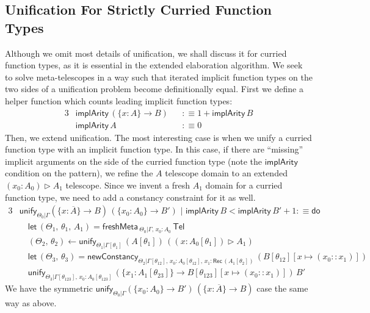 \documentclass[acmsmall,review,anonymous,prologue,dvipsnames]{acmart}\settopmatter{printfolios=true,printccs=false,printacmref=false}
\newcommand{\slet}{\boldsymbol{\mathsf{let}}}
\newcommand{\freshMeta}[3]{\mathsf{freshMeta}\,_{#1|#2}\,#3}
\newcommand{\newConstancy}[5]{\mathsf{newConstancy}_{#1|#2,\,#3 : \Rec\,#4}\,#5}
\newcommand{\unify}{\mathsf{unify}}
\newcommand{\edo}{\boldsymbol{\mathsf{do}}}
\newcommand{\Tel}{\mathsf{Tel}}
\newcommand{\TCons}{\triangleright}
\newcommand{\Rec}{\mathsf{Rec}}
\newcommand{\ol}[1]{\overline{#1}}
\newcommand{\implArity}{\mathsf{implArity}}
\theoremstyle{remark}
\begin{document}
\subsection{Unification For Strictly Curried Function Types}
\label{sec:curriedunif}
Although we omit most details of unification, we shall discuss it for curried
function types, as it is essential in the extended elaboration algorithm. We
seek to solve meta-telescopes in a way such that iterated implicit function
types on the two sides of a unification problem become definitionally
equal. First we define a helper function which counts leading implicit function
types:
\begin{alignat*}{3}
  & \implArity\,(\{x : A\}\to B) && :\equiv 1 + \implArity\,B\\
  & \implArity\,A                && :\equiv 0
\end{alignat*}
Then, we extend unification. The most interesting case is when we unify a
curried function type with an implicit function type. In this case, if there are
``missing'' implicit arguments on the side of the curried function type (note
the $\implArity$ condition on the pattern), we refine the $A$ telescope domain
to an extended $(x_0 : A_0) \TCons A_1$ telescope. Since we invent a fresh $A_1$
domain for a curried function type, we need to add a constancy constraint for it
as well.
\begin{alignat*}{3}
& \unify_{\Theta_0|\Gamma}(\{x : \ol{A}\}\to B)\,(\{x_0 : A_0\}\to B')\,\,|\,\,\implArity\,B < \implArity\,B' + 1 :\equiv \edo\\
& \quad \slet\,(\Theta_1,\,\theta_1,\,A_1) = \freshMeta{\Theta_0}{\Gamma,\,x_0 : A_0}{\Tel}\\
& \quad (\Theta_2,\,\theta_2) \leftarrow
  \unify_{\Theta_1|\Gamma[\theta_1]}\,(A[\theta_1])\,((x : A_0[\theta_1])\TCons A_1)\\
& \quad \slet\,(\Theta_3,\,\theta_3) =
    \newConstancy{\Theta_2}{\Gamma[\theta_{12}],\,x_0 : A_0[\theta_{12}]}{x_1}{(A_1[\theta_2])}{(B[\theta_{12}][x\mapsto (x_0 :: x_1)])}\\
& \quad\unify_{\Theta_3|\Gamma[\theta_{123}],\,x_0 : A_0[\theta_{123}]}\,
         (\{x_1 : A_1[\theta_{23}]\}\to B[\theta_{123}][x\mapsto (x_0 :: x_1)])\,B'
\end{alignat*}
We have the symmetric $\unify_{\Theta_0|\Gamma}(\{x_0 : A_0\}\to B')\,(\{x :
\ol{A}\}\to B)$ case the same way as above.
\end{document}
